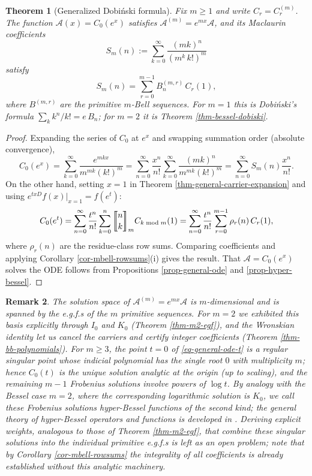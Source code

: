 \documentclass[a4paper]{amsart}
\numberwithin{equation}{section}
\newcommand{\mStirling}[0]{\genfrac{\llbracket}{\rrbracket}{0pt}{}}
\newtheorem{theorem}{Theorem}[section]
\newtheorem{remark}[theorem]{Remark}
\begin{document}
\begin{theorem}[Generalized Dobi\'nski formula]\label{thm-general-dobinski}
Fix $m \geq 1$ and write $C_r = C^{(m)}_r$. The function $\mathcal{A}(x) = C_0(e^x)$ satisfies $\mathcal{A}^{(m)} = e^{mx}\mathcal{A}$, and its Maclaurin coefficients
\[
S_m(n) := \sum_{k=0}^{\infty} \frac{(mk)^n}{\left(m^{k}\,k!\right)^{m}}
\]
satisfy
\[
S_m(n) = \sum_{r=0}^{m-1} B^{(m,r)}_n\, C_r(1),
\]
where $B^{(m,r)}$ are the primitive $m$-Bell sequences. For $m = 1$ this is Dobi\'nski's formula $\sum_k k^n/k! = e\,B_n$; for $m=2$ it is Theorem \ref{thm-bessel-dobiski}.
\end{theorem}
\begin{proof}
Expanding the series of $C_0$ at $e^x$ and swapping summation order (absolute convergence),
\[
C_0(e^x) = \sum_{k=0}^\infty \frac{e^{mkx}}{m^{mk}(k!)^m} = \sum_{n=0}^\infty \frac{x^n}{n!} \sum_{k=0}^\infty \frac{(mk)^n}{m^{mk}(k!)^m} = \sum_{n=0}^\infty S_m(n)\frac{x^n}{n!}.
\]
On the other hand, setting $x = 1$ in Theorem \ref{thm-general-carrier-expansion} and using $e^{txD}f(x)\big|_{x=1} = f(e^t)$:
\[
C_0(e^t) = \sum_{n=0}^\infty \frac{t^n}{n!}\sum_{k=0}^n \mStirling{n}{k}_m C_{k \bmod m}(1) = \sum_{n=0}^\infty \frac{t^n}{n!}\sum_{r=0}^{m-1}\rho_r(n)\,C_r(1),
\]
where $\rho_r(n)$ are the residue-class row sums. Comparing coefficients and applying Corollary \ref{cor-mbell-rowsums}(i) gives the result. That $\mathcal{A} = C_0(e^x)$ solves the ODE follows from Propositions \ref{prop-general-ode} and \ref{prop-hyper-bessel}.
\end{proof}

\begin{remark}\label{rem-solution-space}
The solution space of $\mathcal{A}^{(m)} = e^{mx}\mathcal{A}$ is $m$-dimensional and is spanned by the e.g.f.s of the $m$ primitive sequences. For $m = 2$ we exhibited this basis explicitly through $I_0$ and $K_0$ (Theorem \ref{thm-m2-egf}), and the Wronskian identity let us cancel the carriers and certify integer coefficients (Theorem \ref{thm-bb-polynomials}). For $m \geq 3$, the point $t=0$ of \eqref{eq-general-ode-t} is a regular singular point whose indicial polynomial has the single root $0$ with multiplicity $m$; hence $C_0(t)$ is the unique solution analytic at the origin (up to scaling), and the remaining $m-1$ Frobenius solutions involve powers of $\log t$. By analogy with the Bessel case $m = 2$, where the corresponding logarithmic solution is $K_0$, we call these Frobenius solutions \emph{hyper-Bessel functions of the second kind}; the general theory of hyper-Bessel operators and functions is developed in \cite{kiryakova1994}. Deriving explicit weights, analogous to those of Theorem \ref{thm-m2-egf}, that combine these singular solutions into the individual primitive e.g.f.s is left as an open problem; note that by Corollary \ref{cor-mbell-rowsums} the integrality of all coefficients is already established without this analytic machinery.
\end{remark}
\end{document}
